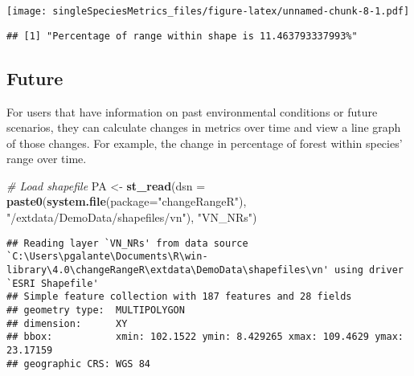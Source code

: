 \documentclass[
]{article}
\newenvironment{Shaded}{\begin{snugshade}}{\end{snugshade}}
\newcommand{\CommentTok}[1]{\textcolor[rgb]{0.56,0.35,0.01}{\textit{#1}}}
\newcommand{\DataTypeTok}[1]{\textcolor[rgb]{0.13,0.29,0.53}{#1}}
\newcommand{\KeywordTok}[1]{\textcolor[rgb]{0.13,0.29,0.53}{\textbf{#1}}}
\newcommand{\NormalTok}[1]{#1}
\newcommand{\OperatorTok}[1]{\textcolor[rgb]{0.81,0.36,0.00}{\textbf{#1}}}
\newcommand{\StringTok}[1]{\textcolor[rgb]{0.31,0.60,0.02}{#1}}
\begin{document}
\texttt{[image: singleSpeciesMetrics\_files/figure-latex/unnamed-chunk-8-1.pdf]}

\begin{Shaded}
\end{Shaded}

\begin{verbatim}
## [1] "Percentage of range within shape is 11.463793337993%"
\end{verbatim}

\hypertarget{future}{%
\subsection{Future}\label{future}}

For users that have information on past environmental conditions or
future scenarios, they can calculate changes in metrics over time and
view a line graph of those changes. For example, the change in
percentage of forest within species' range over time.

\begin{Shaded}
\begin{Highlighting}[]
\CommentTok{# Load shapefile}
\NormalTok{PA <-}\StringTok{ }\KeywordTok{st_read}\NormalTok{(}\DataTypeTok{dsn =} \KeywordTok{paste0}\NormalTok{(}\KeywordTok{system.file}\NormalTok{(}\DataTypeTok{package=}\StringTok{"changeRangeR"}\NormalTok{), }\StringTok{"/extdata/DemoData/shapefiles/vn"}\NormalTok{), }\StringTok{"VN_NRs"}\NormalTok{)}
\end{Highlighting}
\end{Shaded}

\begin{verbatim}
## Reading layer `VN_NRs' from data source `C:\Users\pgalante\Documents\R\win-library\4.0\changeRangeR\extdata\DemoData\shapefiles\vn' using driver `ESRI Shapefile'
## Simple feature collection with 187 features and 28 fields
## geometry type:  MULTIPOLYGON
## dimension:      XY
## bbox:           xmin: 102.1522 ymin: 8.429265 xmax: 109.4629 ymax: 23.17159
## geographic CRS: WGS 84
\end{verbatim}
\end{document}
